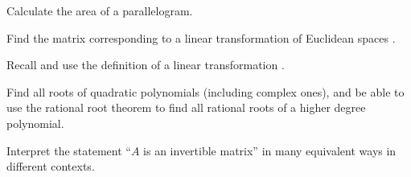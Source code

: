 \begin{readinessAssuranceOutcomes}
\item Calculate the area of a parallelogram.
\item Find the matrix corresponding to a linear transformation of Euclidean spaces .
\item Recall and use the definition of a linear transformation .
\item Find all roots of quadratic polynomials (including complex ones), and be able to use the rational root theorem to find all rational roots of a higher degree polynomial.
\item Interpret the statement ``$A$ is an invertible matrix'' in many equivalent ways in different contexts.
\end{readinessAssuranceOutcomes}
